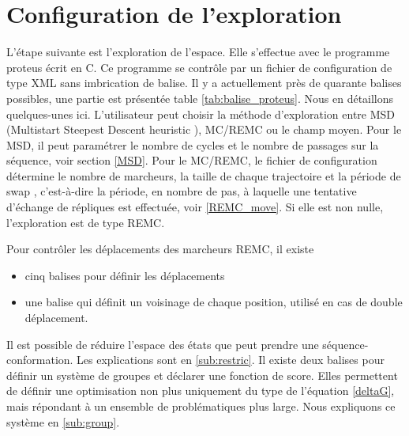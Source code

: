 \section{Configuration de l'exploration}
L'étape suivante est l'exploration de l'espace. Elle s'effectue avec le programme proteus écrit en C. Ce programme se contrôle par un fichier de configuration de type XML sans imbrication de balise. Il y a actuellement près de quarante balises possibles, une partie est présentée table \vref{tab:balise_proteus}. Nous en détaillons quelques-unes ici. L'utilisateur peut choisir la méthode d'exploration entre MSD (\og Multistart Steepest Descent heuristic \fg), MC/REMC ou le champ moyen. Pour le MSD, il peut paramétrer le nombre de cycles et le nombre de passages sur la séquence, voir section \vref{MSD}.
Pour le MC/REMC, le fichier de configuration détermine le nombre de marcheurs, la taille de chaque trajectoire et la période de \og swap \fg, c'est-à-dire la période, en nombre de pas, à laquelle une tentative d'échange de répliques est effectuée, voir \vref{REMC_move}. Si elle est non nulle, l'exploration est de type REMC.

Pour contrôler les déplacements des marcheurs REMC, il existe 
\begin{itemize}
\item cinq  balises pour définir les déplacements
\item une balise qui définit un voisinage de chaque position, utilisé en cas de double déplacement.
\end{itemize}
Il est possible de réduire l'espace des états que peut prendre une séquence-conformation. Les explications sont en \ref{sub:restric}.  Il existe deux balises pour définir un système de groupes et déclarer une fonction de score. Elles permettent de définir une optimisation non plus uniquement du type de l'équation \ref{deltaG}, mais répondant à un ensemble de problématiques plus large. Nous expliquons ce système en \vref{sub:group}.
 
